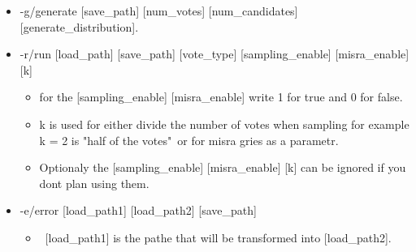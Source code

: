 \documentclass[a4paper,12pt]{report}
\begin{document}
	\begin{itemize}
		\item -g/generate [save\_path] [num\_votes] [num\_candidates] [generate\_distribution].
		\item -r/run [load\_path] [save\_path] [vote\_type] [sampling\_enable] [misra\_enable] [k]
		\begin{itemize}
			\item for the [sampling\_enable] [misra\_enable] write 1 for true and 0 for false.
			\item k is used for either divide the number of votes when sampling for example k = 2 is "half of the votes"\ or for misra gries as a parametr.
			\item Optionaly the [sampling\_enable] [misra\_enable] [k] can be ignored if you dont plan using them.
		\end{itemize}
		\item -e/error [load\_path1] [load\_path2] [save\_path]
		\begin{itemize}
			\item\ [load\_path1] is the pathe that will be transformed into [load\_path2].
		\end{itemize}
	\end{itemize}
	
	
\end{document}
